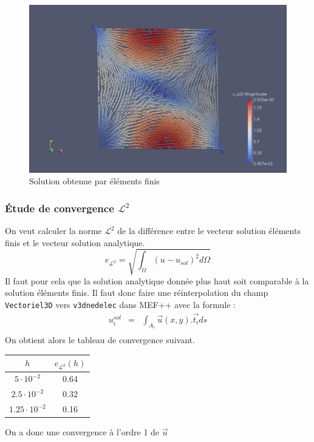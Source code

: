 \documentclass[a4paper,12pt]{article}
\begin{document}
\begin{figure}[h!]
\begin{center}
\includegraphics[scale=0.3]{carre_nedelec.png}
\caption*{Solution obtenue par éléments finis}
\end{center}
\end{figure}
\subsubsection{Étude de convergence $\mathcal{L}^{2}$}
On veut calculer la norme $\mathcal{L}^{2}$ de la différence entre le vecteur solution éléments finis et le vecteur solution analytique. 
\[
e_{\mathcal{L}^{2}} = \sqrt{\int_{\Omega} {(u-u_{sol})^{2} d{\Omega}}}
\]
Il faut pour cela que la solution analytique donnée plus haut soit comparable à la solution éléments finis. Il faut donc faire une réinterpolation du champ
\texttt{Vectoriel3D} vers \texttt{v3dnedelec} dans MEF++ avec la formule :
\begin{eqnarray*}
u_{i}^{sol} &=& \int_{A_{i}} {\vec{u}(x,y).\vec{t_{i}} ds}\\
\end{eqnarray*}
On obtient alors le tableau de convergence suivant.
\begin{center}
\begin{tabular}{|c|c|}
\hline
$h$ & $e_{\mathcal{L}^{2}}(h)$ \\
\hline
$5 \cdot 10^{-2}$ & 0.64 \\
\hline
$2.5 \cdot 10^{-2}$ &  0.32 \\
\hline
$1.25 \cdot 10^{-2}$ &  0.16 \\
\hline
\end{tabular}
\end{center}
On a donc une convergence à l'ordre 1 de $\vec{u}$
\end{document}
